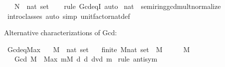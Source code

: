 \begin{isabellebody}
\ \ \ N\ {\isacharcolon}{\kern0pt}{\isacharcolon}{\kern0pt}\ {\isachardoublequoteopen}nat\ set{\isachardoublequoteclose}\isanewline
%
\isadelimproof
\ \ %
\endisadelimproof
%
\isatagproof
{}\isamarkupfalse%
\ {\isacharparenleft}{\kern0pt}rule\ Gcd{\isacharunderscore}{\kern0pt}eq{\isacharunderscore}{\kern0pt}{}{\isacharunderscore}{\kern0pt}I{\isacharparenright}{\kern0pt}\ auto%
\endisatagproof
{\isafoldproof}%
%
\isadelimproof
\isanewline
%
\endisadelimproof
\isanewline
{}\isamarkupfalse%
\ nat\ {\isacharcolon}{\kern0pt}{\isacharcolon}{\kern0pt}\ semiring{\isacharunderscore}{\kern0pt}gcd{\isacharunderscore}{\kern0pt}mult{\isacharunderscore}{\kern0pt}normalize\isanewline
%
\isadelimproof
\ \ %
\endisadelimproof
%
\isatagproof
{}\isamarkupfalse%
\ intro{\isacharunderscore}{\kern0pt}classes\ {\isacharparenleft}{\kern0pt}auto\ simp{\isacharcolon}{\kern0pt}\ unit{\isacharunderscore}{\kern0pt}factor{\isacharunderscore}{\kern0pt}nat{\isacharunderscore}{\kern0pt}def{\isacharparenright}{\kern0pt}%
\endisatagproof
{\isafoldproof}%
%
\isadelimproof
%
\endisadelimproof
%
\begin{isamarkuptext}%
Alternative characterizations of Gcd:%
\end{isamarkuptext}\isamarkuptrue%
\isamarkupfalse%
\ Gcd{\isacharunderscore}{\kern0pt}eq{\isacharunderscore}{\kern0pt}Max{\isacharcolon}{\kern0pt}\isanewline
\ \ \ M\ {\isacharcolon}{\kern0pt}{\isacharcolon}{\kern0pt}\ {\isachardoublequoteopen}nat\ set{\isachardoublequoteclose}\isanewline
\ \ \ {\isachardoublequoteopen}finite\ {\isacharparenleft}{\kern0pt}M{\isacharcolon}{\kern0pt}{\isacharcolon}{\kern0pt}nat\ set{\isacharparenright}{\kern0pt}{\isachardoublequoteclose}\ \ {\isachardoublequoteopen}M\ {\isasymnoteq}\ {\isacharbraceleft}{\kern0pt}{\isacharbraceright}{\kern0pt}{\isachardoublequoteclose}\ \ {\isachardoublequoteopen}{}\ {\isasymnotin}\ M{\isachardoublequoteclose}\isanewline
\ \ \ {\isachardoublequoteopen}Gcd\ M\ {\isacharequal}{\kern0pt}\ Max\ {\isacharparenleft}{\kern0pt}{\isasymInter}m{\isasymin}M{\isachardot}{\kern0pt}\ {\isacharbraceleft}{\kern0pt}d{\isachardot}{\kern0pt}\ d\ dvd\ m{\isacharbraceright}{\kern0pt}{\isacharparenright}{\kern0pt}{\isachardoublequoteclose}\isanewline
%
\isadelimproof
%
\endisadelimproof
%
\isatagproof
{}\isamarkupfalse%
\ {\isacharparenleft}{\kern0pt}rule\ antisym{\isacharparenright}{\kern0pt}\isanewline
\ \ \isamarkupfalse%

\end{isabellebody}
